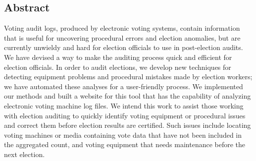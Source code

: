 
\subsection*{Abstract}
Voting audit logs, produced by electronic voting systems, contain information that is useful for uncovering procedural errors and election anomalies, but are currently unwieldy and hard for election officials to use in post-election audits.  We have devised a way to make the auditing process quick and efficient for election officials.  In order to audit elections, we develop new techniques for detecting equipment problems and procedural mistakes made by election workers; we have automated these analyses for a user-friendly process.  We implemented our methods and built a website for this tool that has the capability of analyzing electronic voting machine log files.  We intend this work to assist those working with election auditing to quickly identify voting equipment or procedural issues and correct them before election results are certified.  Such issues include locating voting machines or media containing vote data that have not been included in the aggregated count, and voting equipment that needs maintenance before the next election.
